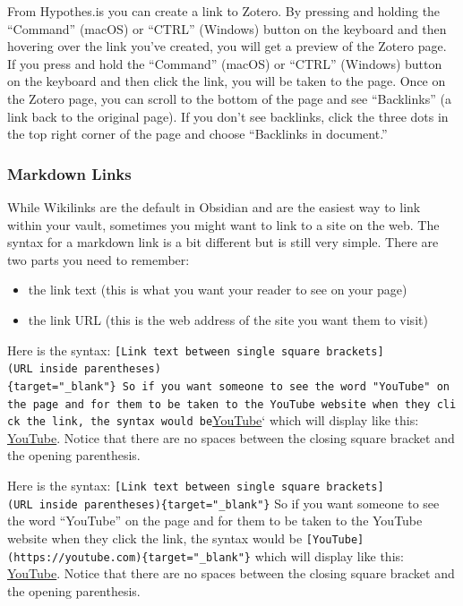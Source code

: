 \documentclass[
  letterpaper,
  DIV=11,
  numbers=noendperiod]{scrreprt}
\providecommand{\tightlist}{%
  \setlength{\itemsep}{0pt}\setlength{\parskip}{0pt}}\usepackage{longtable,booktabs,array}
\begin{document}
From Hypothes.is you can create a link to Zotero. By pressing and
holding the ``Command'' (macOS) or ``CTRL'' (Windows) button on the
keyboard and then hovering over the link you've created, you will get a
preview of the Zotero page. If you press and hold the ``Command''
(macOS) or ``CTRL'' (Windows) button on the keyboard and then click the
link, you will be taken to the page. Once on the Zotero page, you can
scroll to the bottom of the page and see ``Backlinks'' (a link back to
the original page). If you don't see backlinks, click the three dots in
the top right corner of the page and choose ``Backlinks in document.''

\subsubsection*{Markdown Links}\label{markdown-links}

While Wikilinks are the default in Obsidian and are the easiest way to
link within your vault, sometimes you might want to link to a site on
the web. The syntax for a markdown link is a bit different but is still
very simple. There are two parts you need to remember:

\begin{itemize}
\tightlist
\item
  the link text (this is what you want your reader to see on your page)
\item
  the link URL (this is the web address of the site you want them to
  visit)
\end{itemize}

Here is the syntax:
\texttt{{[}Link\ text\ between\ single\ square\ brackets{]}(URL\ inside\ parentheses)\{target="\_blank"\}\ So\ if\ you\ want\ someone\ to\ see\ the\ word\ "YouTube"\ on\ the\ page\ and\ for\ them\ to\ be\ taken\ to\ the\ YouTube\ website\ when\ they\ click\ the\ link,\ the\ syntax\ would\ be}\href{https://youtube.com}{YouTube}`
which will display like this: \href{https://youtube.com}{YouTube}.
Notice that there are no spaces between the closing square bracket and
the opening parenthesis.

Here is the syntax:
\texttt{{[}Link\ text\ between\ single\ square\ brackets{]}(URL\ inside\ parentheses)\{target="\_blank"\}}
So if you want someone to see the word ``YouTube'' on the page and for
them to be taken to the YouTube website when they click the link, the
syntax would be
\texttt{{[}YouTube{]}(https://youtube.com)\{target="\_blank"\}} which
will display like this: \href{https://youtube.com}{YouTube}. Notice that
there are no spaces between the closing square bracket and the opening
parenthesis.
\end{document}
